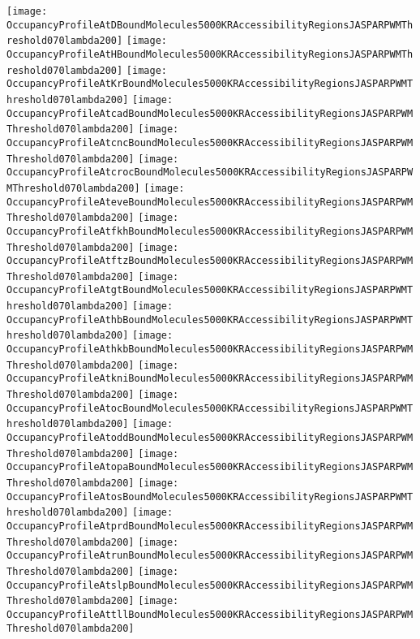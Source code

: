 \documentclass[11pt]{article}
\begin{document}
 


\begin{center}
\texttt{[image: OccupancyProfileAtDBoundMolecules5000KRAccessibilityRegionsJASPARPWMThreshold070lambda200]}
\texttt{[image: OccupancyProfileAtHBoundMolecules5000KRAccessibilityRegionsJASPARPWMThreshold070lambda200]}
\texttt{[image: OccupancyProfileAtKrBoundMolecules5000KRAccessibilityRegionsJASPARPWMThreshold070lambda200]}
\texttt{[image: OccupancyProfileAtcadBoundMolecules5000KRAccessibilityRegionsJASPARPWMThreshold070lambda200]}
\texttt{[image: OccupancyProfileAtcncBoundMolecules5000KRAccessibilityRegionsJASPARPWMThreshold070lambda200]}
\texttt{[image: OccupancyProfileAtcrocBoundMolecules5000KRAccessibilityRegionsJASPARPWMThreshold070lambda200]}
\texttt{[image: OccupancyProfileAteveBoundMolecules5000KRAccessibilityRegionsJASPARPWMThreshold070lambda200]}
\texttt{[image: OccupancyProfileAtfkhBoundMolecules5000KRAccessibilityRegionsJASPARPWMThreshold070lambda200]}
\texttt{[image: OccupancyProfileAtftzBoundMolecules5000KRAccessibilityRegionsJASPARPWMThreshold070lambda200]}
\texttt{[image: OccupancyProfileAtgtBoundMolecules5000KRAccessibilityRegionsJASPARPWMThreshold070lambda200]}
\texttt{[image: OccupancyProfileAthbBoundMolecules5000KRAccessibilityRegionsJASPARPWMThreshold070lambda200]}
\texttt{[image: OccupancyProfileAthkbBoundMolecules5000KRAccessibilityRegionsJASPARPWMThreshold070lambda200]}
\texttt{[image: OccupancyProfileAtkniBoundMolecules5000KRAccessibilityRegionsJASPARPWMThreshold070lambda200]}
\texttt{[image: OccupancyProfileAtocBoundMolecules5000KRAccessibilityRegionsJASPARPWMThreshold070lambda200]}
\texttt{[image: OccupancyProfileAtoddBoundMolecules5000KRAccessibilityRegionsJASPARPWMThreshold070lambda200]}
\texttt{[image: OccupancyProfileAtopaBoundMolecules5000KRAccessibilityRegionsJASPARPWMThreshold070lambda200]}
\texttt{[image: OccupancyProfileAtosBoundMolecules5000KRAccessibilityRegionsJASPARPWMThreshold070lambda200]}
\texttt{[image: OccupancyProfileAtprdBoundMolecules5000KRAccessibilityRegionsJASPARPWMThreshold070lambda200]}
\texttt{[image: OccupancyProfileAtrunBoundMolecules5000KRAccessibilityRegionsJASPARPWMThreshold070lambda200]}
\texttt{[image: OccupancyProfileAtslpBoundMolecules5000KRAccessibilityRegionsJASPARPWMThreshold070lambda200]}
\texttt{[image: OccupancyProfileAttllBoundMolecules5000KRAccessibilityRegionsJASPARPWMThreshold070lambda200]}
\end{center}


\end{document}
